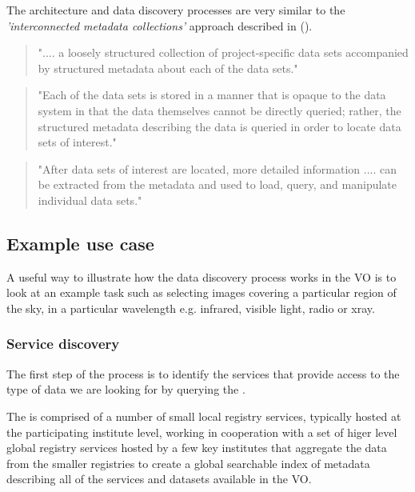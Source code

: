 \documentclass{article}
\begin{document}
The \cite{vo} architecture and data discovery processes are very similar to the
\textit{'interconnected metadata collections'} approach described in
 (\cite{jones-2006}).

\begin{quote}
".... a loosely structured collection of project-specific data sets
accompanied by structured metadata about each of the data sets."
\end{quote}

\begin{quote}
"Each of the data sets is stored in a manner that is opaque to the data system in
that the data themselves cannot be directly queried; rather, the structured
metadata describing the data is queried in order to locate data sets of
interest."
\end{quote}

\begin{quote}
"After data sets of interest are located, more detailed information
.... can be extracted from the metadata and used to load, query, and
manipulate individual data sets."
\end{quote}

\subsection{Example use case}

A useful way to illustrate how the data discovery process works in the VO
is to look at an example task such as selecting images covering a particular
region of the sky, in a particular wavelength e.g. infrared, visible light,
radio or xray.

\subsubsection{Service discovery}

The first step of the process is to identify the services that provide access to
the type of data we are looking for by querying the \cite{ivoa.reg}.

The \cite{ivoa.reg} is comprised of a number of small local registry services,
typically hosted at the participating institute level, working in cooperation
with a set of higer level global registry services hosted by a few key institutes
that aggregate the data from the smaller registries to create a global searchable
index of metadata describing all of the services and datasets available in
the VO.
\end{document}

